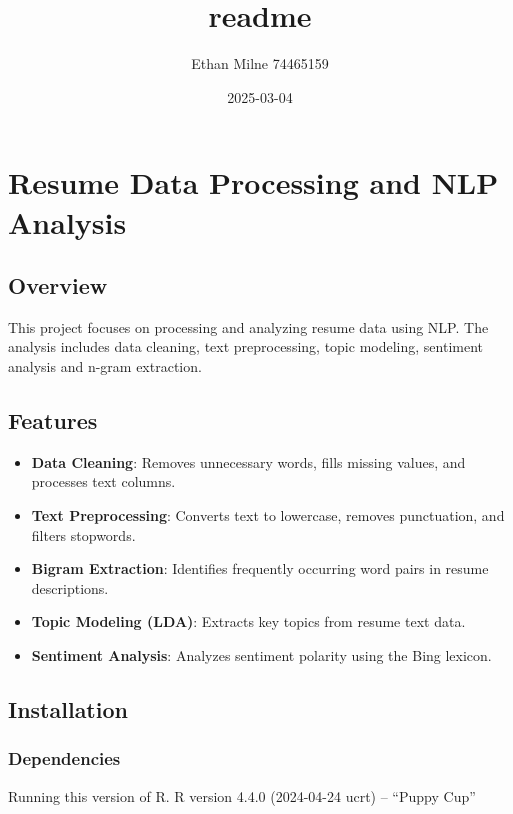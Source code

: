 \documentclass[
]{article}
\title{readme}
\author{Ethan Milne 74465159}
\date{2025-03-04}
\providecommand{\tightlist}{%
  \setlength{\itemsep}{0pt}\setlength{\parskip}{0pt}}
\begin{document}
\maketitle

\section{Resume Data Processing and NLP
Analysis}\label{resume-data-processing-and-nlp-analysis}

\subsection{Overview}\label{overview}

This project focuses on processing and analyzing resume data using NLP.
The analysis includes data cleaning, text preprocessing, topic modeling,
sentiment analysis and n-gram extraction.

\subsection{Features}\label{features}

\begin{itemize}
\tightlist
\item
  \textbf{Data Cleaning}: Removes unnecessary words, fills missing
  values, and processes text columns.
\item
  \textbf{Text Preprocessing}: Converts text to lowercase, removes
  punctuation, and filters stopwords.
\item
  \textbf{Bigram Extraction}: Identifies frequently occurring word pairs
  in resume descriptions.
\item
  \textbf{Topic Modeling (LDA)}: Extracts key topics from resume text
  data.
\item
  \textbf{Sentiment Analysis}: Analyzes sentiment polarity using the
  Bing lexicon.
\end{itemize}

\subsection{Installation}\label{installation}

\subsubsection{Dependencies}\label{dependencies}

Running this version of R. R version 4.4.0 (2024-04-24 ucrt) -- ``Puppy
Cup''
\end{document}
